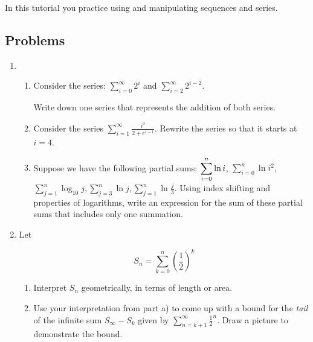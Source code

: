 		
\begin{objectives}
	In this tutorial you practice using and manipulating sequences and series.
\end{objectives}

	\vspace{-1em}
\subsection*{Problems}
\begin{enumerate}
	\item 
    
        \begin{enumerate}
            \item %
            Consider the series: 
             $\displaystyle \sum_{i=0}^\infty 2^{i}$ and $\displaystyle \sum_{i=2}^\infty 2^{i-2}$.

            Write down one series that represents the addition of both series.

            \item %
            Consider the series $\displaystyle \sum_{i=1}^\infty \frac{i^3}{2+e^{i-1}}$. Rewrite the series so that it starts at $i=4$.
            
            \item Suppose we have the following partial sums: $\displaystyle \displaystyle \sum_{i=0}^n \ln{i}$, $\displaystyle \sum_{i=0}^n \ln{i^2}$, $\displaystyle \sum_{j=1}^n \log_{10}{j}, \displaystyle \sum_{j=3}^n \ln{j}, \displaystyle \sum_{j=1}^n \ln{\frac{j}{3}}$. Using index shifting and properties of logarithms, write an expression for the sum of these partial sums that includes only one summation.
            
        \end{enumerate}%
        
        \item %

        Let 
        
        \[S_n = \sum^n_{k=0} \left(\frac{1}{2}\right)^k\]

        \begin{enumerate}
            \item Interpret $S_n$ geometrically, in terms of length or area.

            \item Use your interpretation from part a) to come up with a bound for the \textit{tail} of the infinite sum $S_{\infty}-S_k$ given by $\displaystyle \sum_{n=k+1}^\infty \frac{1}{2}^n$. Draw a picture to demonstrate the bound.


\end{enumerate}
\end{enumerate}
